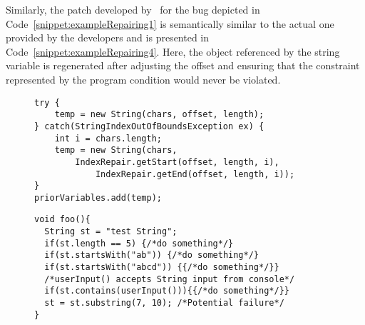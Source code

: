 Similarly, the patch developed by \tool\ for the bug depicted in
Code~\ref{snippet:exampleRepairing1} is semantically similar to the actual one
provided by the developers and is presented in
Code~\ref{snippet:exampleRepairing4}. Here, the object referenced by the string
variable  is regenerated after adjusting the offset and ensuring that
the constraint represented by the program condition 
would never be violated.


\lstset{language=java, caption=Patch for the Apache Log4j bug.,
label = snippet:exampleRepairing4, firstnumber =4}
\begin{figure}[t]
\centering
\begin{lstlisting}
try {
    temp = new String(chars, offset, length);
} catch(StringIndexOutOfBoundsException ex) {
    int i = chars.length;
    temp = new String(chars,
        IndexRepair.getStart(offset, length, i),
            IndexRepair.getEnd(offset, length, i));
}
priorVariables.add(temp);
\end{lstlisting}
\end{figure}


\lstset{language=Java, caption=Static and dynamic constraint
collection example, label = snippet:constraintCollection, firstnumber =1}
\begin{figure}[t]
\begin{lstlisting}
void foo(){
  String st = "test String";
  if(st.length == 5) {/*do something*/}
  if(st.startsWith("ab")) {/*do something*/}
  if(st.startsWith("abcd")) {{/*do something*/}}
  /*userInput() accepts String input from console*/
  if(st.contains(userInput())){{/*do something*/}}
  st = st.substring(7, 10); /*Potential failure*/
}
\end{lstlisting}
\end{figure}


